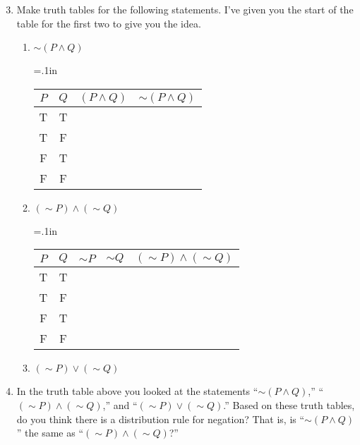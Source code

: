 \documentclass[12 pt]{article}
\theoremstyle{definition}
\theoremstyle{plain}
\theoremstyle{mytheorem}
\theoremstyle{myexample}
\theoremstyle{mydefinition}
\begin{document}
\begin{enumerate}
\setcounter{enumi}{2}
\item Make truth tables for the following statements.  I've given you the start of the table for the first two to give you the idea.
	\begin{enumerate}
	\item $\sim\!( P \wedge Q)$\\
	
		{\tabulinesep=.1in
		\begin{tabu}{|cc|c:c|}
		\hline
		$P$ & $Q$ &$ (P \wedge Q)$ & $\sim\!(P \wedge Q)$\\
		\hline
		T & T & \ & \ \\
		T & F & \ & \ \\
		F & T & \ & \ \\
		F & F & \ & \ \\
		\hline
		\end{tabu}}
		\medskip
	\item $(\sim\!P) \wedge (\sim\!Q)$\\
	
	{\tabulinesep=.1in
	\begin{tabu}{|cc|c:c:c|}
		\hline
		$P$ & $Q$ &$ \sim\!P$ & $\sim\!Q$ & $(\sim\!P) \wedge (\sim\!Q)$\\
		\hline
		T & T & \ & \ & \ \\
		T & F & \ & \ & \ \\
		F & T & \ & \ & \ \\
		F & F & \ & \ & \ \\
		\hline
		\end{tabu}}

	\item $(\sim\!P) \vee (\sim\!Q)$
	
	\vspace{3in}
	
	\end{enumerate}
	
\item In the truth table above you looked at the statements ``$\sim\!( P \wedge Q)$,'' ``$(\sim\!P) \wedge (\sim\!Q)$,'' and ``$(\sim\!P) \vee (\sim\!Q)$.''  Based on these truth tables, do you think there is a distribution rule for negation?  That is, is ``$\sim\!( P \wedge Q)$'' the same as ``$(\sim\!P) \wedge (\sim\!Q)$?''

\vspace{.75in}

\end{enumerate}
\end{document}

